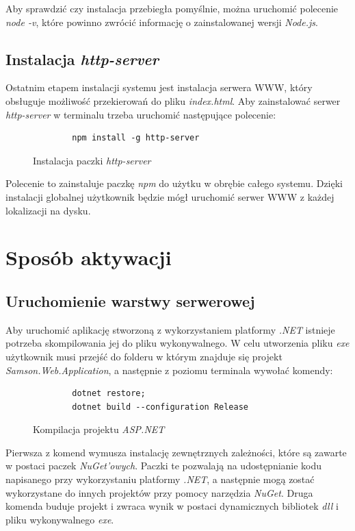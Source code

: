 \documentclass[a4paper,twoside,12pt]{book}
\begin{document}
Aby sprawdzić czy instalacja przebiegła pomyślnie, można uruchomić polecenie \textit{node -v}, które powinno zwrócić informację o zainstalowanej wersji \textit{Node.js}.

\subsection {Instalacja \textit{http-server}}
Ostatnim etapem instalacji systemu jest instalacja serwera WWW, który obsługuje możliwość przekierowań do pliku \textit{index.html}. Aby zainstalować serwer \textit{http-server} w terminalu trzeba uruchomić następujące polecenie:
\begin{figure} [H]
	\centering
	\begin{lstlisting}
		npm install -g http-server
	\end{lstlisting}
	\caption{Instalacja paczki \textit{http-server}}
	\label{fig:httpServerInstall}
\end{figure}

Polecenie to zainstaluje paczkę \textit{npm} do użytku w obrębie całego systemu. Dzięki instalacji globalnej użytkownik będzie mógł uruchomić serwer WWW z każdej lokalizacji na dysku.

\section {Sposób aktywacji}
\subsection{Uruchomienie warstwy serwerowej}
Aby uruchomić aplikację stworzoną z wykorzystaniem platformy \textit{.NET} istnieje potrzeba skompilowania jej do pliku wykonywalnego. W celu utworzenia pliku \textit{exe} użytkownik musi przejść do folderu w którym znajduje się projekt \textit{Samson.Web.Application}, a następnie z poziomu terminala wywołać komendy:
\begin{figure} [H]
	\centering
	\begin{lstlisting}
		dotnet restore;
		dotnet build --configuration Release
	\end{lstlisting}
	\caption{Kompilacja projektu \textit{ASP.NET}}
	\label{fig:dotnetCompilation}
\end{figure}
Pierwsza z komend wymusza instalację zewnętrznych zależności, które są zawarte w postaci paczek \textit{NuGet'owych}. Paczki te pozwalają na udostępnianie kodu napisanego przy wykorzystaniu platformy \textit{.NET}, a następnie mogą zostać wykorzystane do innych projektów przy pomocy narzędzia \textit{NuGet}. Druga komenda buduje projekt i zwraca wynik w postaci dynamicznych bibliotek \textit{dll} i pliku wykonywalnego \textit{exe}.
\end{document}
